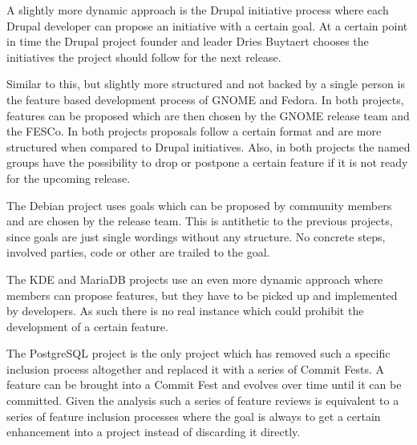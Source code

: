 A slightly more dynamic approach is the Drupal initiative process where each Drupal
developer can propose an initiative with a certain goal. At a certain point in
time the Drupal project founder and leader Dries Buytaert chooses the
initiatives the project should follow for the next release.

Similar to this, but slightly more structured and not backed by a single person
is the feature based development process of GNOME and Fedora. In both projects,
features can be proposed which are then chosen by the GNOME release team and
the \ac{FESCo}. In both projects proposals follow a certain format and are more
structured when compared to Drupal initiatives. Also, in both projects the
named groups have the possibility to drop or postpone a certain feature if it
is not ready for the upcoming release.

The Debian project uses goals which can be proposed by community members and
are chosen by the release team. This is antithetic to the previous projects,
since goals are just single wordings without any structure. No concrete steps,
involved parties, code or other are trailed to the goal.

The KDE and MariaDB projects use an even more dynamic approach where members
can propose features, but they have to be picked up and implemented by
developers. As such there is no real instance which could prohibit the
development of a certain feature.

The PostgreSQL project is the only project which has removed such a specific
inclusion process altogether and replaced it with a series of Commit Fests. A
feature can be brought into a Commit Fest and evolves over time until it can be
committed. Given the analysis such a series of feature reviews is equivalent to
a series of feature inclusion processes where the goal is always to get a
certain enhancement into a project instead of discarding it directly.



